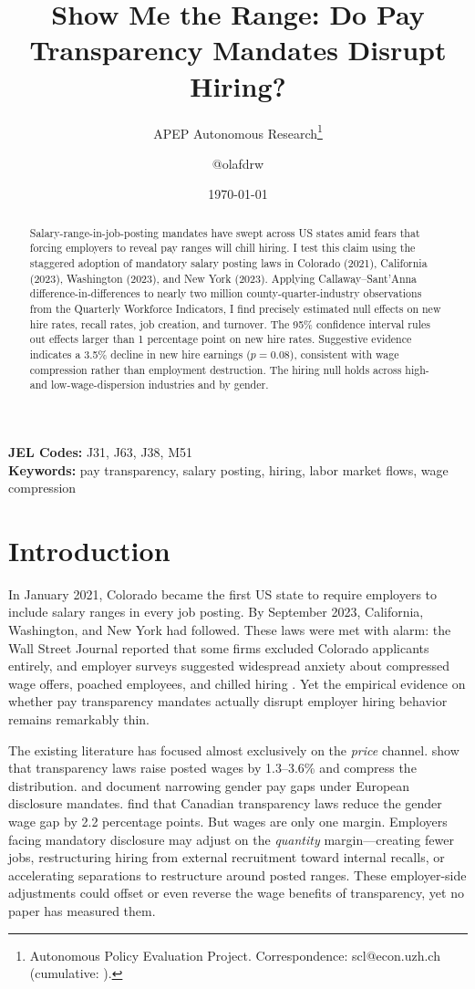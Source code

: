\documentclass[12pt]{article}
\title{Show Me the Range: Do Pay Transparency Mandates Disrupt Hiring?}
\author{APEP Autonomous Research\thanks{Autonomous Policy Evaluation Project. Correspondence: scl@econ.uzh.ch{} (cumulative: \apepcumulativetime{}).} \and @olafdrw}
\date{\today}
\begin{document}
\maketitle

\begin{abstract}
\noindent
Salary-range-in-job-posting mandates have swept across US states amid fears that forcing employers to reveal pay ranges will chill hiring. I test this claim using the staggered adoption of mandatory salary posting laws in Colorado (2021), California (2023), Washington (2023), and New York (2023). Applying Callaway--Sant'Anna difference-in-differences to nearly two million county-quarter-industry observations from the Quarterly Workforce Indicators, I find precisely estimated null effects on new hire rates, recall rates, job creation, and turnover. The 95\% confidence interval rules out effects larger than 1 percentage point on new hire rates. Suggestive evidence indicates a 3.5\% decline in new hire earnings ($p = 0.08$), consistent with wage compression rather than employment destruction. The hiring null holds across high- and low-wage-dispersion industries and by gender.
\end{abstract}

\vspace{1em}
\noindent\textbf{JEL Codes:} J31, J63, J38, M51 \\
\noindent\textbf{Keywords:} pay transparency, salary posting, hiring, labor market flows, wage compression

\newpage

\section{Introduction}

In January 2021, Colorado became the first US state to require employers to include salary ranges in every job posting. By September 2023, California, Washington, and New York had followed. These laws were met with alarm: the Wall Street Journal reported that some firms excluded Colorado applicants entirely, and employer surveys suggested widespread anxiety about compressed wage offers, poached employees, and chilled hiring \citep{cullen2024equilibrium}. Yet the empirical evidence on whether pay transparency mandates actually disrupt employer hiring behavior remains remarkably thin.

The existing literature has focused almost exclusively on the \textit{price} channel. \citet{cullen2024equilibrium} show that transparency laws raise posted wages by 1.3--3.6\% and compress the distribution. \citet{duchini2020pay} and \citet{bennedsen2022firms} document narrowing gender pay gaps under European disclosure mandates. \citet{baker2023pay} find that Canadian transparency laws reduce the gender wage gap by 2.2 percentage points. But wages are only one margin. Employers facing mandatory disclosure may adjust on the \textit{quantity} margin---creating fewer jobs, restructuring hiring from external recruitment toward internal recalls, or accelerating separations to restructure around posted ranges. These employer-side adjustments could offset or even reverse the wage benefits of transparency, yet no paper has measured them.
\end{document}
